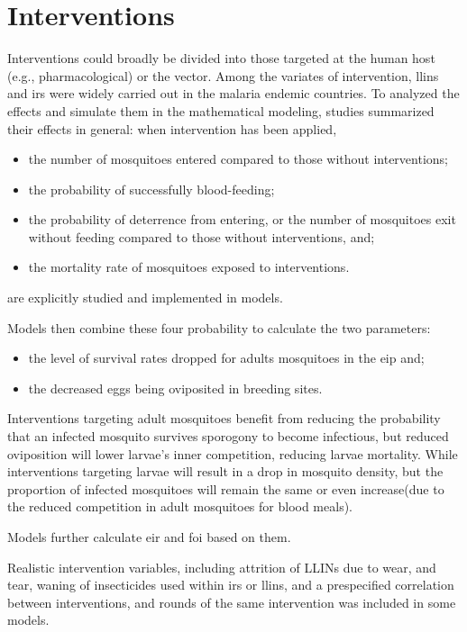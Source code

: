 \documentclass[a4paper, 12pt, twoside]{report}
\begin{document}
\section{Interventions}
Interventions could broadly be divided into those targeted at the human host (e.g., pharmacological) or the vector.
Among the variates of intervention, \gls{llins} and \gls{irs} were widely carried out in the malaria endemic countries. 
To analyzed the effects and simulate them in the mathematical modeling, studies summarized their effects in general: when intervention has been applied,

\begin{itemize}
	\item the number of mosquitoes entered compared to those without interventions;
  \item the probability of successfully blood-feeding;
	\item the probability of deterrence from entering, or the number of mosquitoes exit without feeding compared to those without interventions, and;
	\item the mortality rate of mosquitoes exposed to interventions.
\end{itemize}

are explicitly studied and implemented in models.

Models then combine these four probability to calculate the two parameters: 
\begin{itemize}
	\item the level of survival rates dropped for adults mosquitoes in the \gls{eip} and;
	\item the decreased eggs being oviposited in breeding sites.
\end{itemize}

Interventions targeting adult mosquitoes benefit from reducing the probability that an infected mosquito survives sporogony to become infectious, but reduced oviposition will lower larvae's inner competition, reducing larvae mortality.
While interventions targeting larvae will result in a drop in mosquito density, but the proportion of infected mosquitoes will remain the same or even increase(due to the reduced competition in adult mosquitoes for blood meals).

Models further calculate \gls{eir} and \gls{foi} based on them.

Realistic intervention variables, including attrition of LLINs due to wear, and tear, waning of insecticides used within \gls{irs} or \gls{llins}, and a prespecified correlation between interventions, and rounds of the same intervention was included in some models\cite{Walker2016}.
\end{document}
